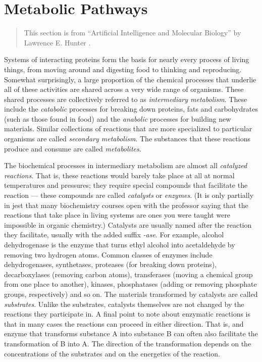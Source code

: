 \section{Metabolic Pathways}
\label{sect:metabolic_pathways}

\begin{verse}
    This section is from ``Artificial Intelligence and Molecular Biology'' by
    Lawrence E. Hunter \cite{mb-for-cs}.
\end{verse}

Systems of interacting proteins form the basis for nearly every process of
living things, from moving around and digesting food to thinking and
reproducing. Somewhat surprisingly, a large proportion of the chemical processes
that underlie all of these activities are shared across a very wide range of
organisms. These shared processes are collectively referred to as
\emph{intermediary metabolism}. These include the \emph{catabolic} processes for
breaking down proteins, fats and carbohydrates (such as those found in food) and
the \emph{anabolic} processes for building new materials. Similar collections of
reactions that are more specialized to particular organisms are called
\emph{secondary metabolism}. The substances that these reactions produce and
consume are called \emph{metabolites}.

The biochemical processes in intermediary metabolism are almost all
\emph{catalyzed reactions}. That is, these reactions would barely take place at
all at normal temperatures and pressures; they require special compounds that
facilitate the reaction --- these compounds are called \emph{catalysts} or
\emph{enzymes}. (It is only partially in jest that many biochemistry courses
open with the professor saying that the reactions that take place in living
systems are ones you were taught were impossible in organic chemistry.)
Catalysts are usually named after the reaction they facilitate, usually with the
added suffix \emph{-ase}. For example, alcohol dehydrogenase is the enzyme that
turns ethyl alcohol into acetaldehyde by removing two hydrogen atoms. Common
classes of enzymes include dehydrogenases, synthetases, proteases (for breaking
down proteins), decarboxylases (removing carbon atoms), transferases (moving a
chemical group from one place to another), kinases, phosphatases (adding or
removing phosphate groups, respectively) and so on. The materials transformed by
catalysts are called \emph{substrates}. Unlike the substrates, catalysts
themselves are not changed by the reactions they participate in. A final point
to note about enzymatic reactions is that in many cases the reactions can
proceed in either direction. That is, and enzyme that transforms substance A
into substance B can often also facilitate the transformation of B into A. The
direction of the transformation depends on the concentrations of the substrates
and on the energetics of the reaction.


